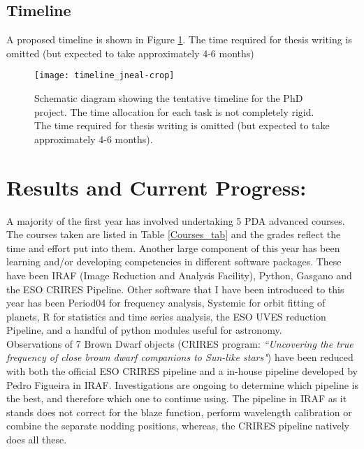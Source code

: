 \documentclass[pdftex,12pt,a4paper]{article}
\begin{document}
\subsection*{Timeline}
A proposed timeline is shown in Figure \ref{timeline_fig}. The time
required for thesis writing is omitted (but expected to take approximately 4-6 months)

\begin{landscape}
\begin{figure}
\texttt{[image: timeline\_jneal-crop]}
\caption{Schematic diagram showing the tentative timeline for the PhD project. The time allocation for each task is not completely rigid. The time required for thesis writing is omitted (but expected to take approximately 4-6 months).
\label{timeline_fig}}
\end{figure}
\end{landscape}

\newpage
\section{Results and Current Progress:}
\label{current_progress}
A majority of the first year has involved undertaking 5 PDA advanced courses. The courses taken are listed in Table \ref{Courses_tab} and the grades reflect the time and effort put into them. Another large component of this year has been learning and/or developing competencies in different software packages. These have been IRAF (Image Reduction and Analysis Facility), Python, Gasgano and the ESO CRIRES Pipeline.
Other software that I have been introduced to this year has been Period04 for frequency analysis, Systemic for orbit fitting of planets, R for statistics and time series analysis, the ESO UVES reduction Pipeline, and a handful of python modules useful for astronomy.\\

Observations of 7 Brown Dwarf objects (CRIRES program: \textit{``Uncovering the true frequency of close brown dwarf companions to Sun-like stars"}) have been reduced with both the official ESO CRIRES pipeline and a in-house pipeline developed by Pedro Figueira in IRAF. Investigations are ongoing to determine which pipeline is the best, and therefore which one to continue using. The pipeline in IRAF as it stands does not correct for the blaze function, perform wavelength calibration or combine the separate nodding positions, whereas, the CRIRES pipeline natively does all these.\\
\end{document}
